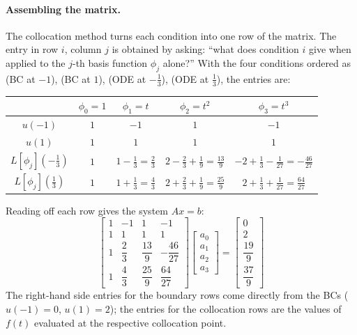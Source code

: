 \documentclass{article}
\begin{document}
\paragraph{Assembling the matrix.}
The collocation method turns each condition into one row of the matrix.  The entry in
row $i$, column $j$ is obtained by asking: ``what does condition $i$ give when applied to the
$j$-th basis function $\phi_j$ alone?''  With the four conditions ordered as
(BC at $-1$), (BC at $1$), (ODE at $-\tfrac{1}{3}$), (ODE at $\tfrac{1}{3}$), the entries are:

\begin{center}
\renewcommand{\arraystretch}{1.6}
\begin{tabular}{c|cccc}
 & $\phi_0 = 1$ & $\phi_1 = t$ & $\phi_2 = t^2$ & $\phi_3 = t^3$ \\
\hline
$u(-1)$
    & $1$ & $-1$ & $1$ & $-1$ \\
$u(1)$
    & $1$ & $1$ & $1$ & $1$ \\
$L[\phi_j]\!\left(-\tfrac{1}{3}\right)$
    & $1$
    & $1 - \tfrac{1}{3} = \tfrac{2}{3}$
    & $2 - \tfrac{2}{3} + \tfrac{1}{9} = \tfrac{13}{9}$
    & $-2 + \tfrac{1}{3} - \tfrac{1}{27} = -\tfrac{46}{27}$ \\
$L[\phi_j]\!\left(\tfrac{1}{3}\right)$
    & $1$
    & $1 + \tfrac{1}{3} = \tfrac{4}{3}$
    & $2 + \tfrac{2}{3} + \tfrac{1}{9} = \tfrac{25}{9}$
    & $2 + \tfrac{1}{3} + \tfrac{1}{27} = \tfrac{64}{27}$ \\
\end{tabular}
\end{center}
Reading off each row gives the system $Ax = b$:
\begin{equation}
\begin{bmatrix}
1 & -1 & 1 & -1 \\[4pt]
1 &  1 & 1 &  1 \\[4pt]
1 & \dfrac{2}{3}  & \dfrac{13}{9}  & -\dfrac{46}{27} \\[10pt]
1 & \dfrac{4}{3}  & \dfrac{25}{9}  &  \dfrac{64}{27}
\end{bmatrix}
\begin{bmatrix} a_0 \\ a_1 \\ a_2 \\ a_3 \end{bmatrix}
=
\begin{bmatrix} 0 \\[4pt] 2 \\[4pt] \dfrac{19}{9} \\[10pt] \dfrac{37}{9} \end{bmatrix}
\end{equation}
The right-hand side entries for the boundary rows come directly from the BCs
($u(-1)=0$, $u(1)=2$); the entries for the collocation rows are the values of $f(t)$
evaluated at the respective collocation point.
\end{document}
